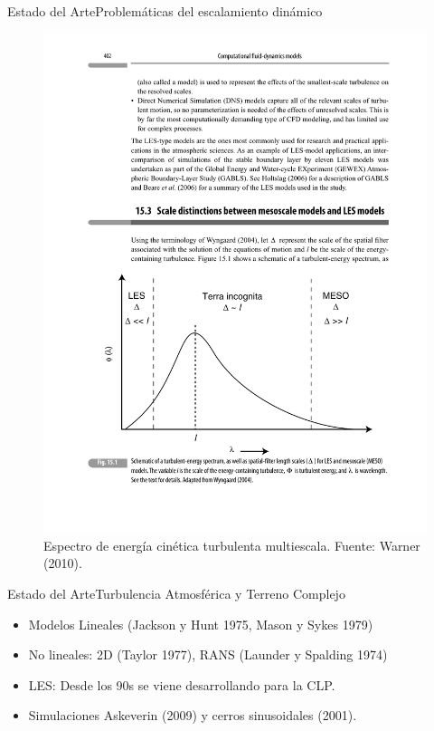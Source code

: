 \documentclass[mathserif]{beamer}
\begin{document}
\begin{frame}{Estado del Arte}{Problemáticas del escalamiento dinámico}
	\begin{figure}
		\centering
		\includegraphics[width=0.9\linewidth,trim={2cm 3.0cm 1.5cm 11.5cm},clip]{fig/02/terra_inc}
		\caption{Espectro de energía cinética turbulenta multiescala. Fuente: Warner (2010).}
		\label{fig:02_terra_inc}
	\end{figure}
\end{frame}

\begin{frame}{Estado del Arte}{Turbulencia Atmosférica y Terreno Complejo}
	\begin{itemize}
		\item Modelos Lineales (Jackson y Hunt 1975, Mason y Sykes 1979)
		\item No lineales: 2D (Taylor 1977), RANS (Launder y Spalding 1974)
		\item LES: Desde los 90s se viene desarrollando para la CLP.
		\item Simulaciones Askeverin (2009) y cerros sinusoidales (2001).
	\end{itemize}
\end{frame}
\end{document}
